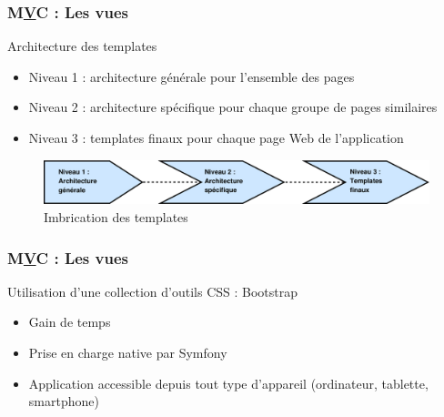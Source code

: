\begin{frame}
\frametitle{M\underline{V}C : Les vues}
\begin{block}{Architecture des templates}
	\begin{itemize}
		\item Niveau 1 : architecture générale pour l'ensemble des pages
		\item Niveau 2 : architecture spécifique pour chaque groupe de pages similaires
		\item Niveau 3 : templates finaux pour chaque page Web de l'application
	\end{itemize}
\end{block}
\begin{figure}[!h]
	\begin{center}
	\includegraphics[scale=0.3]{images/archiTemplates}
	\caption{Imbrication des templates}
	\end{center}
\end{figure}
\end{frame}

\begin{frame}
\frametitle{M\underline{V}C : Les vues}
\begin{block}{Utilisation d'une collection d'outils CSS : Bootstrap}
	\begin{itemize}
		\item Gain de temps
		\item Prise en charge native par Symfony
		\item Application accessible depuis tout type d'appareil (ordinateur, tablette, smartphone)
	\end{itemize}
\end{block}
\end{frame}

